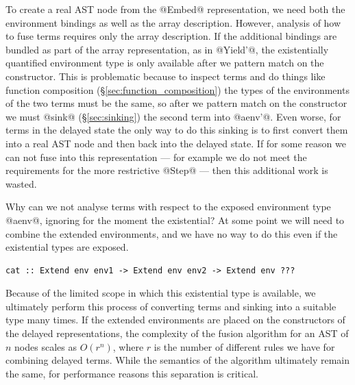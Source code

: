 To create a real AST node from the @Embed@
representation, we need both the environment bindings as well as the array
description. However, analysis of how to fuse terms requires only the array
description. If the additional bindings are bundled as part of the array
representation, as in @Yield'@, the existentially quantified environment
type is only available after we pattern match on the constructor. This is
problematic because to inspect terms and do things like function composition
(\S\ref{sec:function_composition}) the types of the environments of the two
terms must be the same, so after we pattern match on the constructor we must
@sink@ (\S\ref{sec:sinking}) the second term into @aenv'@. Even worse,
for terms in the delayed state the only way to do this sinking is to first
convert them into a real AST node and then back into the delayed state. If for
some reason we can not fuse into this representation --- for example we do not
meet the requirements for the more restrictive @Step@ --- then this
additional work is wasted.

Why can we not analyse terms with respect to the exposed environment type
@aenv@, ignoring for the moment the existential? At some point we will need
to combine the extended environments, and we have no way to do this even if the
existential types are exposed.
%
\begin{lstlisting}[style=haskell]
cat :: Extend env env1 -> Extend env env2 -> Extend env ???
\end{lstlisting}

Because of the limited scope in which this existential type is available, we
ultimately perform this process of converting terms and sinking into a suitable
type many times. If the extended environments are placed on the constructors of
the delayed representations, the complexity of the fusion algorithm for an AST
of $n$ nodes scales as $O(r^n)$, where $r$ is the number of different rules we
have for combining delayed terms. While the semantics of the algorithm
ultimately remain the same, for performance reasons this separation is critical.

